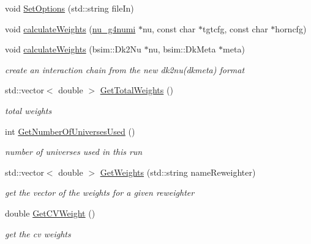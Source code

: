 \begin{DoxyCompactItemize}
\item 
void \hyperlink{class_neutrino_flux_reweight_1_1_make_reweight_acb37bf019d26bed210504058edfad7d1}{Set\-Options} (std\-::string file\-In)
\item 
void \hyperlink{class_neutrino_flux_reweight_1_1_make_reweight_adee6ac1cfbf80febe94a3057d2b5d27d}{calculate\-Weights} (\hyperlink{classnu__g4numi}{nu\-\_\-g4numi} $\ast$nu, const char $\ast$tgtcfg, const char $\ast$horncfg)
\item 
void \hyperlink{class_neutrino_flux_reweight_1_1_make_reweight_a71967c35cc34d6a37a6e5624c808e5e3}{calculate\-Weights} (bsim\-::\-Dk2\-Nu $\ast$nu, bsim\-::\-Dk\-Meta $\ast$meta)
\begin{DoxyCompactList}\small\item\em create an interaction chain from the new dk2nu(dkmeta) format \end{DoxyCompactList}\item 
std\-::vector$<$ double $>$ \hyperlink{class_neutrino_flux_reweight_1_1_make_reweight_abe11878f3611652f797ba9d714078028}{Get\-Total\-Weights} ()
\begin{DoxyCompactList}\small\item\em total weights \end{DoxyCompactList}\item 
int \hyperlink{class_neutrino_flux_reweight_1_1_make_reweight_a963401a9e7bea5f6edb6ba6354f61c8f}{Get\-Number\-Of\-Universes\-Used} ()
\begin{DoxyCompactList}\small\item\em number of universes used in this run \end{DoxyCompactList}\item 
std\-::vector$<$ double $>$ \hyperlink{class_neutrino_flux_reweight_1_1_make_reweight_a0930b1505dd56da5dc7cd4ab85587cfc}{Get\-Weights} (std\-::string name\-Reweighter)
\begin{DoxyCompactList}\small\item\em get the vector of the weights for a given reweighter \end{DoxyCompactList}\item 
double \hyperlink{class_neutrino_flux_reweight_1_1_make_reweight_a56b69218f55fbe2cceb4b3c6022ae506}{Get\-C\-V\-Weight} ()
\begin{DoxyCompactList}\small\item\em get the cv weights \end{DoxyCompactList}\end{DoxyCompactItemize}
